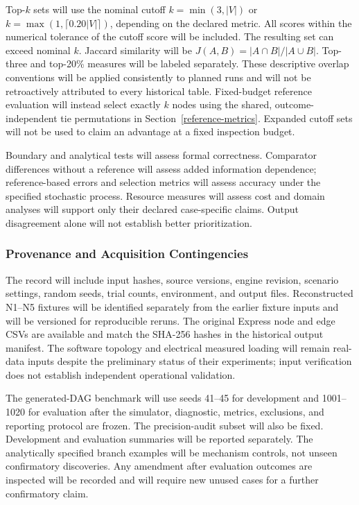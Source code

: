 Top-$k$ sets will use the nominal cutoff
$k=\min(3,|V|)$ or $k=\max(1,\lceil0.20|V|\rceil)$, depending on the
declared metric. All scores within the numerical tolerance of the cutoff
score will be included. The resulting set can exceed nominal $k$.
Jaccard similarity will be
$J(A,B)=|A\cap B|/|A\cup B|$.
Top-three and top-20\% measures will be labeled separately.
These descriptive overlap conventions will be applied consistently to
planned runs and will not be retroactively attributed to every historical
table. Fixed-budget reference evaluation will instead select exactly $k$
nodes using the shared, outcome-independent tie permutations in
Section~\ref{reference-metrics}. Expanded cutoff sets will not be used to
claim an advantage at a fixed inspection budget.

Boundary and analytical tests will assess formal correctness. Comparator
differences without a reference will assess added information dependence;
reference-based errors and selection metrics will assess accuracy under the
specified stochastic process. Resource measures will assess cost and domain
analyses will support only their declared case-specific claims. Output disagreement alone will not establish
better prioritization.

\subsubsection{Provenance and Acquisition Contingencies}

The record will include input hashes, source versions, engine revision,
scenario settings, random seeds, trial counts, environment, and output
files. Reconstructed N1--N5 fixtures will be identified separately from
the earlier fixture inputs and will be versioned for reproducible reruns.
The original Express node and edge CSVs are available and match the
SHA-256 hashes in the historical output manifest. The software topology
and electrical measured loading will remain real-data inputs despite
the preliminary status of their experiments; input verification does
not establish independent operational validation.

The generated-DAG benchmark will use seeds 41--45 for development and
1001--1020 for evaluation after the simulator, diagnostic, metrics, exclusions,
and reporting protocol are frozen. The precision-audit subset will also be fixed.
Development and evaluation summaries will
be reported separately. The analytically specified branch examples will be
mechanism controls, not unseen confirmatory discoveries. Any amendment after
evaluation outcomes are inspected will be recorded and will require new
unused cases for a further confirmatory claim.

